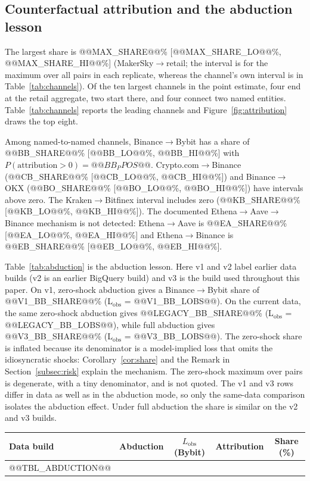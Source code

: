 \documentclass[referee,pdflatex,sn-mathphys-ay]{sn-jnl}
\newcommand{\fitbox}{\ifdim\wd\tabbox>\linewidth\resizebox{\linewidth}{!}{\usebox{\tabbox}}\else\usebox{\tabbox}\fi}%
\theoremstyle{thmstyleone}%
\theoremstyle{thmstyletwo}%
\theoremstyle{thmstylethree}%
\begin{document}
\subsection{Counterfactual attribution and the abduction lesson}
\label{subsec:attribution}
The largest share is @@MAX_SHARE@@\% [@@MAX_SHARE_LO@@\%, @@MAX_SHARE_HI@@\%] (MakerSky$\to$retail; the interval is for the maximum over all pairs in each replicate, whereas the channel's own interval is in Table~\ref{tab:channels}). Of the ten largest channels
in the point estimate, four end at the retail aggregate, two start there, and four connect two named entities.
Table~\ref{tab:channels} reports the leading channels and Figure~\ref{fig:attribution} draws the top eight.

Among named-to-named channels, Binance$\to$Bybit has a share of @@BB_SHARE@@\% [@@BB_LO@@\%, @@BB_HI@@\%] with
$P(\text{attribution}>0)=@@BB_PPOS@@$. Crypto.com$\to$Binance (@@CB_SHARE@@\% [@@CB_LO@@\%, @@CB_HI@@\%]) and
Binance$\to$OKX (@@BO_SHARE@@\% [@@BO_LO@@\%, @@BO_HI@@\%]) have intervals above zero. The Kraken$\to$Bitfinex interval includes
zero (@@KB_SHARE@@\% [@@KB_LO@@\%, @@KB_HI@@\%]). The documented Ethena$\to$Aave$\to$Binance mechanism is not detected: Ethena$\to$Aave
is @@EA_SHARE@@\% [@@EA_LO@@\%, @@EA_HI@@\%] and Ethena$\to$Binance is @@EB_SHARE@@\% [@@EB_LO@@\%, @@EB_HI@@\%].

Table~\ref{tab:abduction} is the abduction lesson. Here v1 and v2 label earlier data builds (v2 is an earlier
BigQuery build) and v3 is the build used throughout this paper. On v1, zero-shock abduction gives a
Binance$\to$Bybit share of @@V1_BB_SHARE@@\% (L$_{\text{obs}}$ = @@V1_BB_LOBS@@). On the current data, the same
zero-shock abduction gives @@LEGACY_BB_SHARE@@\% (L$_{\text{obs}}$ = @@LEGACY_BB_LOBS@@), while full abduction gives
@@V3_BB_SHARE@@\% (L$_{\text{obs}}$ = @@V3_BB_LOBS@@). The zero-shock share is inflated because its denominator is a
model-implied loss that omits the idiosyncratic shocks: Corollary~\ref{cor:share} and the Remark in
Section~\ref{subsec:risk} explain the mechanism. The zero-shock maximum over pairs is degenerate, with a tiny
denominator, and is not quoted. The v1 and v3 rows differ in data as well as in the
abduction mode, so only the same-data comparison isolates the abduction effect. Under full abduction the share is similar on the
v2 and v3 builds.

\begin{lrbox}{\tabbox}\footnotesize\setlength{\tabcolsep}{3pt}%
\begin{tabular}{@{}llccc@{}}
\toprule
\textbf{Data build} & \textbf{Abduction} & \textbf{$L_{\mathrm{obs}}$(Bybit)} & \textbf{Attribution} & \textbf{Share (\%)}\\
\midrule
@@TBL_ABDUCTION@@
\bottomrule
\end{tabular}
\end{lrbox}
\begin{tableorg}[tbp]
\centering
\caption{Abduction lesson for Binance$\to$Bybit. Attribution is the drop in Bybit's loss; the share is attribution
divided by $L_{\mathrm{obs}}$, which is the realised hinge loss under full abduction and the model-implied loss under zero-shock abduction.}
\label{tab:abduction}
\fitbox
\end{tableorg}
\end{document}
